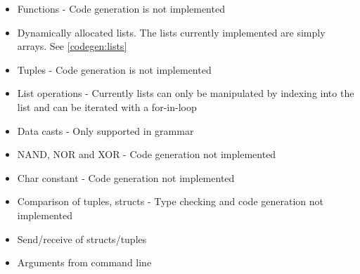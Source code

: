 \begin{itemize}
\item Functions - Code generation is not implemented
\item Dynamically allocated lists. The lists currently implemented are simply arrays. See \cref{codegen:lists}
\item Tuples - Code generation is not implemented
\item List operations - Currently lists can only be manipulated by indexing into the list and can be iterated with a for-in-loop
\item Data casts - Only supported in grammar
\item NAND, NOR and XOR - Code generation not implemented
\item Char constant - Code generation not implemented
\item Comparison of tuples, structs - Type checking and code generation not implemented
\item Send/receive of structs/tuples
\item Arguments from command line
\end{itemize}
